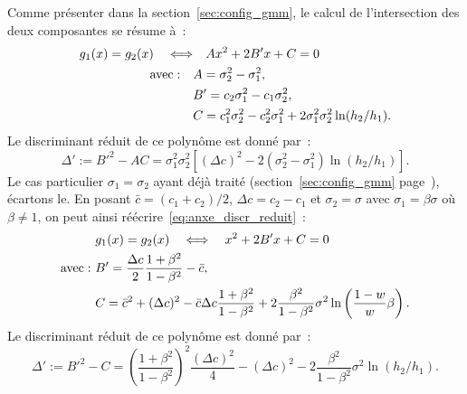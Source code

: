 \documentclass[main.tex]{subfiles}
\begin{document}
Comme présenter dans la section~\ref{sec:config_gmm}, le calcul de l'intersection des deux composantes se résume à~:
\begin{equation}
\begin{aligned}
\label{eq:anxe_polynome}
g_1(x)=g_2(x) \quad \Longleftrightarrow & \quad  Ax^2 + 2B'x + C =0 \\
{\rm avec :} \quad &A=\sigma_2^2 - \sigma_1^2, \\
& B'=c_2\sigma_1^2-c_1\sigma_2^2,\\
& C= c_1^2\sigma_2^2-c_2^2\sigma_1^2 +  2\sigma_1^2\sigma_2^2 \ln( h_2 / h_1 ).
\end{aligned}
\end{equation}
Le discriminant réduit de ce polynôme est donné par~:
\begin{equation}
\label{eq:anxe_discr_reduit}
\Delta' := B'^2 - AC = \sigma_1^2 \sigma_2^2 \left[ (\Delta c)^2 - 2(\sigma_2^2-\sigma_1^2) \ln (h_2/h_1)  \right].
\end{equation}
Le cas particulier $\sigma_1 = \sigma_2$ ayant déjà traité (\cf section~\ref{sec:config_gmm} page~\pageref{para:cas_partic_polynome}), écartons le. 
En posant $\bar{c}=(c_1+c_2)/2$, $\Delta c = c_2-c_1$ et $\sigma_2=\sigma$ avec $\sigma_1=\beta \sigma$ où $\beta\neq 1$, on peut ainsi réécrire~\ref{eq:anxe_discr_reduit}~:
%
\begin{equation}
\begin{aligned}
\label{eq:anxe_polynome3}
&g_1(x)=g_2(x) \quad \Longleftrightarrow  \quad  x^2 + 2B'x + C =0 \\
{\rm avec :}\ & B'=\frac{\Delta c}{2} \frac{1+\beta^2}{1-\beta^2}-\bar{c},\\
& C= \bar{c}^2+(\Delta c)^2 -\bar{c}\Delta c \frac{1+\beta^2}{1-\beta^2} + 2 \frac{\beta^2}{1-\beta^2} \sigma^2 \ln \left( \frac{1-w}{w}\beta \right).
\end{aligned}
\end{equation}
Le discriminant réduit de ce polynôme est donné par~:
\begin{equation}
\label{eq:anxe_discr_reduit}
\Delta' := B'^2 - C = \left( \frac{1+\beta^2}{1-\beta^2} \right)^2 \frac{(\Delta c)^2}{4} - (\Delta c)^2  - 2 \frac{\beta^2}{1-\beta^2} \sigma^2 \ln (h_2/h_1).
\end{equation}
\end{document}

